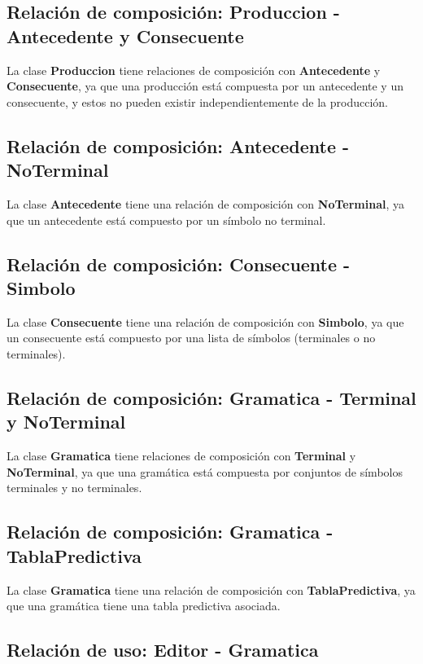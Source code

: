 \subsection{Relación de composición: Produccion - Antecedente y Consecuente}

La clase \textbf{Produccion} tiene relaciones de composición con \textbf{Antecedente} y \textbf{Consecuente}, ya que una producción está compuesta por un antecedente y un consecuente, y estos no pueden existir independientemente de la producción.

\subsection{Relación de composición: Antecedente - NoTerminal}

La clase \textbf{Antecedente} tiene una relación de composición con \textbf{NoTerminal}, ya que un antecedente está compuesto por un símbolo no terminal.

\subsection{Relación de composición: Consecuente - Simbolo}

La clase \textbf{Consecuente} tiene una relación de composición con \textbf{Simbolo}, ya que un consecuente está compuesto por una lista de símbolos (terminales o no terminales).

\subsection{Relación de composición: Gramatica - Terminal y NoTerminal}

La clase \textbf{Gramatica} tiene relaciones de composición con \textbf{Terminal} y \textbf{NoTerminal}, ya que una gramática está compuesta por conjuntos de símbolos terminales y no terminales.

\subsection{Relación de composición: Gramatica - TablaPredictiva}

La clase \textbf{Gramatica} tiene una relación de composición con \textbf{TablaPredictiva}, ya que una gramática tiene una tabla predictiva asociada.

\subsection{Relación de uso: Editor - Gramatica}

